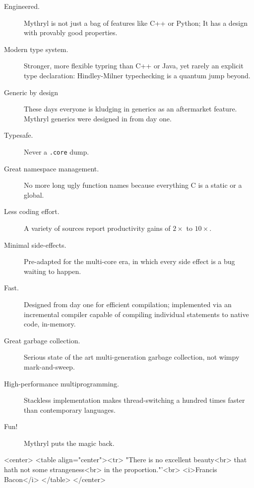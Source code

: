 \documentclass{book}
\begin{document}
\begin{description}
\item[Engineered.] Mythryl is not just a bag of features like C++ or Python;  It has a design with provably good properties.
\item[Modern type system.] Stronger, more flexible typring than C++ or Java, yet rarely an explicit type declaration:  Hindley-Milner typechecking is a quantum jump beyond.
\item[Generic by design]  These days everyone is kludging in generics as an aftermarket feature.  Mythryl generics were designed in from day one.
\item[Typesafe.]  Never a \verb#.core# dump.
\item[Great namespace management.]  No more long ugly function names because everything C is a static or a global.
\item[Less coding effort.]  A variety of sources report productivity gains of $2\times$ to $10\times$.
\item[Minimal side-effects.]  Pre-adapted for the multi-core era, in which every side effect is a bug waiting to happen.
\item[Fast.]  Designed from day one for efficient compilation;  implemented via an incremental compiler capable of compiling individual statements to native code, in-memory.
\item[Great garbage collection.]  Serious state of the art multi-generation garbage collection, not wimpy mark-and-sweep.
\item[High-performance multiprogramming.]  Stackless implementation makes thread-switching a hundred times faster than contemporary languages.
\item[Fun!]  Mythryl puts the magic back.
\end{description}

\begin{rawhtml}
<center>
<table align="center"><tr>
"There is no excellent beauty<br>
that hath not some strangeness<br>
in the proportion."'<br>
<i>Francis Bacon</i>
</table>
</center>
\end{rawhtml}
\end{document}
